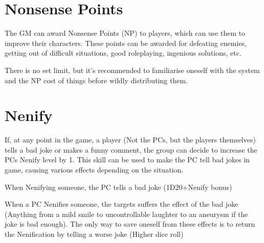 \section{Nonsense Points}

The GM can award Nonsense Points (NP) to players, which can use them to improve their characters. These points can be awarded for defeating enemies, getting out of difficult situations, good roleplaying, ingenious solutions, etc. 

There is no set limit, but it's recommended to familiarise oneself with the system and the NP cost of things before wildly distributing them.

\section{Nenify}

If, at any point in the game, a player (Not the PCs, but the players themselves) tells a bad joke or makes a funny comment, the group can decide to increase the PCs Nenify level by 1. This skill can be used to make the PC tell bad jokes in game, causing various effects depending on the situation.
\par
When Nenifying someone, the PC tells a bad joke (1D20+Nenify bonus)
\par 
When a PC Nenifies someone, the targets suffers the effect of the bad joke (Anything from a mild smile to uncontrollable laughter to an aneurysm if the joke is bad enough). The only way to save oneself from these effects is to return the Nenification by telling a worse joke (Higher dice roll)